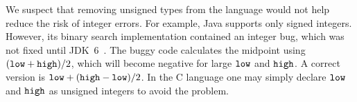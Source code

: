We suspect that removing unsigned types from the language would
not help reduce the risk of integer errors.  For example, Java
supports only signed integers.  However, its binary search
implementation contained an integer bug, which was not fixed until
JDK~6~\cite{java-bsearch}.  The buggy code calculates the midpoint
using $(\texttt{low} + \texttt{high})/2$, which will become negative for
large $\texttt{low}$ and $\texttt{high}$.  A correct version is $\texttt{low}
+ (\texttt{high}-\texttt{low})/2$.  In the C language one may simply declare
$\texttt{low}$ and $\texttt{high}$ as unsigned integers to avoid the problem.

